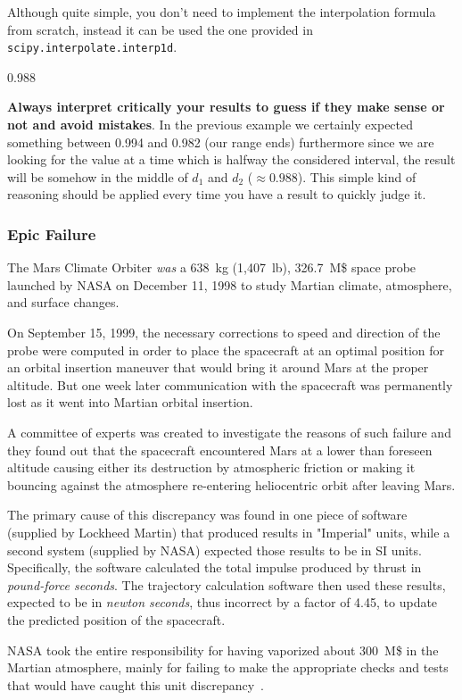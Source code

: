 Although quite simple, you don't need to implement the interpolation formula from scratch, instead it can be used the one provided in 
\texttt{scipy.interpolate.interp1d}. 


\begin{ioutput}
0.988
\end{ioutput}

\textbf{Always interpret critically your results to guess if they make sense or not and avoid mistakes}. In the previous example we certainly expected something between 0.994 and 0.982 (our range ends) furthermore since we are looking for the value at a time which is halfway the considered interval, the result will be somehow in the middle of $d_1$ and $d_2$ ($\approx 0.988$). This simple kind of reasoning should be applied every time you have a result to quickly judge it.

\begin{curiosity}
\subsubsection{Epic Failure}
The Mars Climate Orbiter \emph{was} a 638~kg (1,407~lb), 326.7~M\$ space probe launched by NASA on December 11, 1998 to study Martian climate, atmosphere, 
and surface changes. 

On September 15, 1999, the necessary corrections to speed and direction of the probe were computed in order to place the spacecraft at an optimal position 
for an orbital insertion maneuver that would bring it around Mars at the proper altitude. 
But one week later communication with the spacecraft was permanently lost as it went into Martian orbital insertion. 

A committee of experts was created to investigate the reasons of 
such failure and they found out that the spacecraft encountered Mars at a lower than foreseen altitude causing either its destruction by atmospheric 
friction or making it bouncing against the atmosphere re-entering heliocentric orbit after leaving Mars.

The primary cause of this discrepancy was found in one piece of software (supplied by Lockheed Martin) that produced results in "Imperial" units, 
while a second system (supplied by NASA) expected those results to be in SI units. Specifically, the software calculated the total impulse produced by 
thrust in \emph{pound-force seconds}. The trajectory calculation software then used these results, expected to be in \emph{newton seconds}, thus 
incorrect by a factor of 4.45, to update the predicted position of the spacecraft.
	
NASA took the entire responsibility for having vaporized about 300~M\$ in the Martian atmosphere, mainly for failing to make the appropriate checks and 
tests that would have caught this unit discrepancy~\cite{bib:mars}.	
\end{curiosity}

